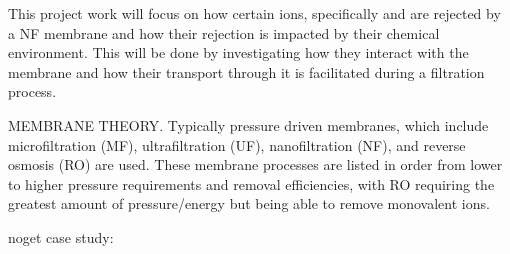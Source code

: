 This project work will focus on how certain ions, specifically  and  are rejected by a NF membrane and how their rejection is impacted by their chemical environment.
This will be done by investigating how they interact with the membrane and how their transport through it is facilitated during a filtration process.



MEMBRANE THEORY. 
Typically pressure driven membranes, which include microfiltration (MF),
ultrafiltration (UF), nanofiltration (NF), and reverse osmosis (RO) are used. 
These membrane processes are listed in order from lower to higher pressure requirements and removal efficiencies, with RO requiring the greatest amount of pressure/energy but being able to remove monovalent ions.\citep{keo} 

noget case study: 




